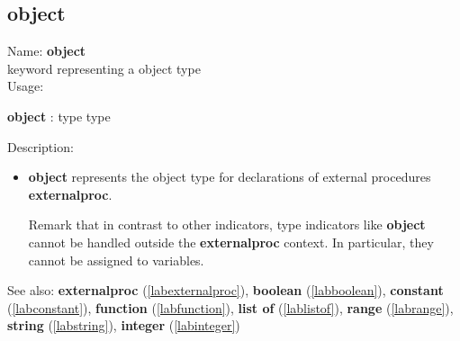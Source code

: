 \subsection{object}
\label{labobject}
\noindent Name: \textbf{object}\\
\phantom{aaa}keyword representing a \sollya object type \\[0.2cm]
\noindent Usage: 
\begin{center}
\textbf{object} : \textsf{type type}\\
\end{center}
\noindent Description: \begin{itemize}

\item \textbf{object} represents the \sollya object type for declarations
   of external procedures \textbf{externalproc}.
    
   Remark that in contrast to other indicators, type indicators like
   \textbf{object} cannot be handled outside the \textbf{externalproc} context.  In
   particular, they cannot be assigned to variables.
\end{itemize}
See also: \textbf{externalproc} (\ref{labexternalproc}), \textbf{boolean} (\ref{labboolean}), \textbf{constant} (\ref{labconstant}), \textbf{function} (\ref{labfunction}), \textbf{list of} (\ref{lablistof}), \textbf{range} (\ref{labrange}), \textbf{string} (\ref{labstring}), \textbf{integer} (\ref{labinteger})
